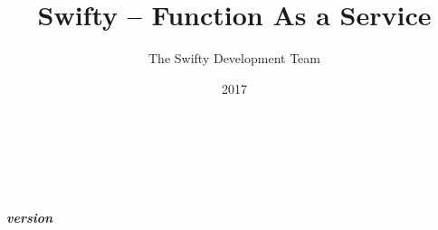 \documentclass[oneside,openany]{book}
\title{Swifty -- Function As a Service}
\author{The Swifty Development Team}
\date{2017}
\begin{document}
\raggedright

\makeatletter
\begin{titlepage}
	\begin{center} \vspace*{\fill}
		\begin{flushleft}
		{\huge \bfseries {\@title}}				\\
		\end{flushleft}
		\noindent\makebox[\linewidth]{\rule{\textwidth}{2pt}}	\\
		\begin{flushright}
		{\large \bfseries \emph{version \version}}		\\[8ex]
		\end{flushright}
	\vspace*{\fill} \end{center}
   \end{titlepage}
\makeatother
\thispagestyle{empty}

\tableofcontents
{}

%



\printindex
\end{document}
